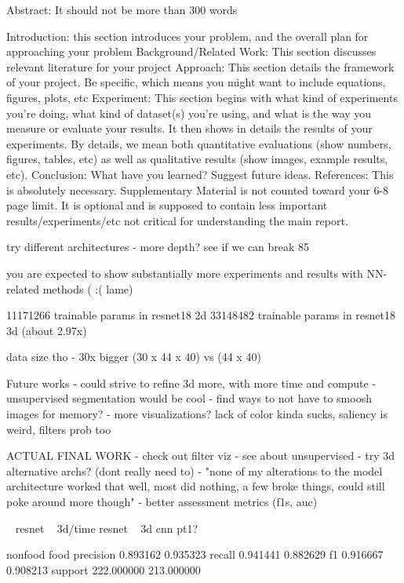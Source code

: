 \documentclass[10pt,twocolumn,letterpaper]{article}
\begin{document}
Abstract: It should not be more than 300 words

Introduction: this section introduces your problem, and the overall plan for approaching your problem
Background/Related Work: This section discusses relevant literature for your project
Approach: This section details the framework of your project. Be specific, which means you might want to include equations, figures, plots, etc
Experiment: This section begins with what kind of experiments you're doing, what kind of dataset(s) you're using, and what is the way you measure or evaluate your results. It then shows in details the results of your experiments. By details, we mean both quantitative evaluations (show numbers, figures, tables, etc) as well as qualitative results (show images, example results, etc).
Conclusion: What have you learned? Suggest future ideas.
References: This is absolutely necessary.
Supplementary Material is not counted toward your 6-8 page limit. It is optional and is supposed to contain less important results/experiments/etc not critical for understanding the main report.

try different architectures - more depth?
see if we can break 85%

you are expected to show substantially more experiments and results with NN-related methods
( :(  lame)

11171266 trainable params in resnet18 2d
33148482 trainable params in resnet18 3d (about 2.97x)

data size tho -
30x bigger (30 x 44 x 40) vs (44 x 40)

Future works
- could strive to refine 3d more, with more time and compute
- unsupervised segmentation would be cool
- find ways to not have to smoosh images for memory?
- more visualizations? lack of color kinda sucks, saliency is weird, filters prob too

ACTUAL FINAL WORK
- check out filter viz
- see about unsupervised
- try 3d alternative archs? (dont really need to)
- "none of my alterations to the model architecture worked that well, most did nothing, a few broke things, could still poke around more though"
- better assessment metrics (f1s, auc)

~\cite{he2016deep} resnet
~\cite{tran2018closer} 3d/time resnet
~\cite{hara3dcnns} 3d cnn pt1?


              nonfood        food
precision    0.893162    0.935323
recall       0.941441    0.882629
f1           0.916667    0.908213
support    222.000000  213.000000

{\small


}
\end{document}
